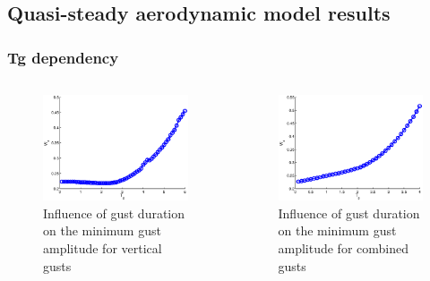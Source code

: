\documentclass[compress]{beamer}
\begin{document}
\subsection{Quasi-steady aerodynamic model results}

\begin{frame}
  \frametitle{Tg dependency}
  \begin{columns}
    \begin{figure}[h!]
      \begin{center}
	\includegraphics[width=1\textwidth]{./Figures/Wg_vs_TG_windtype=1_alhpamax=12_nodalphalimit.eps}
      \end{center}
      \caption{Influence of gust duration on the minimum gust amplitude for vertical gusts}
      \label{fig:vertical_amplitude_duration}
    \end{figure}
    \begin{figure}[h!]
      \begin{center}
	\includegraphics[width=1\textwidth]{./Figures/Wg_vs_TG_windtype=3_alhpamax=12_nodalphalimit.eps}
      \end{center}
      \caption{Influence of gust duration on the minimum gust amplitude for combined gusts}
      \label{fig:combined_amplitude_duration}
    \end{figure}
  \end{columns} %
\end{frame}
\end{document}
